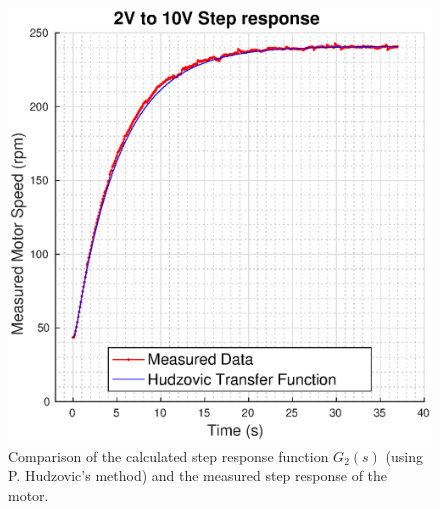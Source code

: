 \begin{figure}
    \centering
    \includegraphics[width=\linewidth]{images/hudzovic}
    \caption{Comparison of the calculated step response function $G_2(s)$ (using P. Hudzovic's method) and the measured step response of the motor.}
    \label{fig:hudzovic_step}
\end{figure}

